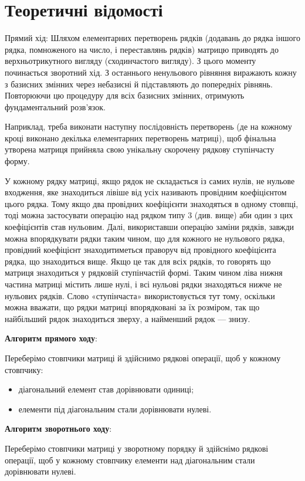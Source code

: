 \documentclass{report}
\begin{document}
\section*{Теоретичні відомості}
Прямий хід: Шляхом елементарних перетворень рядків (додавань до рядка іншого рядка, помноженого на число, і переставлянь рядків) матрицю приводять до верхньотрикутного вигляду (сходинчастого вигляду). З цього моменту починається зворотний хід. З останнього ненульового рівняння виражають кожну з базисних змінних через небазисні й підставляють до попередніх рівнянь. Повторюючи цю процедуру для всіх базисних змінних, отримують фундаментальний розв'язок.\par
Наприклад, треба виконати наступну послідовність перетворень (де на кожному кроці виконано декілька елементарних перетворень матриці), щоб фінальна утворена матриця прийняла свою унікальну скорочену рядкову ступінчасту форму.\par
У кожному рядку матриці, якщо рядок не складається із самих нулів, не нульове входження, яке знаходиться лівіше від усіх називають провідним коефіцієнтом цього рядка. Тому якщо два провідних коефіцієнти знаходяться в одному стовпці, тоді можна застосувати операцію над рядком типу 3 (див. вище) аби один з цих коефіцієнтів став нульовим. Далі, використавши операцію заміни рядків, завжди можна впорядкувати рядки таким чином, що для кожного не нульового рядка, провідний коефіцієнт знаходитиметься праворуч від провідного коефіцієнта рядка, що знаходиться вище. Якщо це так для всіх рядків, то говорять що матриця знаходиться у рядковій ступінчастій формі. Таким чином ліва нижня частина матриці містить лише нулі, і всі нульові рядки знаходяться нижче не нульових рядків. Слово «ступінчаста» використовується тут тому, оскільки можна вважати, що рядки матриці впорядковані за їх розміром, так що найбільший рядок знаходиться зверху, а найменший рядок — знизу.\par
\textbf{Алгоритм прямого ходу}:\par
Переберімо стовпчики матриці й здійснимо рядкові операції, щоб у кожному стовпчику:
\begin{itemize}
	\item діагональний елемент став дорівнювати одиниці;
	\item елементи під діагональним стали дорівнювати нулеві.
\end{itemize}
\textbf{Алгоритм зворотнього ходу}:\par
Переберімо стовпчики матриці у зворотному порядку й здійснімо рядкові операції, щоб у кожному стовпчику елементи над діагональним стали дорівнювати нулеві.
\end{document}
